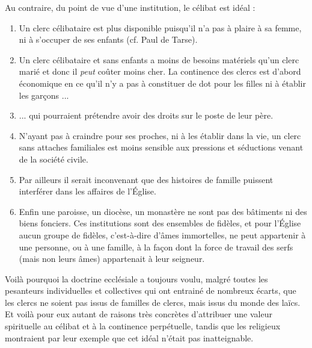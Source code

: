  Au contraire, du point de vue d'une institution, le célibat est idéal :
\begin{enumerate}
\item Un clerc célibataire est plus disponible puisqu'il n'a pas à plaire à sa femme, ni à s'occuper de ses enfants (cf. Paul de Tarse).
\item Un clerc célibataire et sans enfants a moins de besoins matériels qu'un clerc marié et donc il \emph{peut} coûter moins cher. La continence des clercs est d'abord économique en ce qu'il n'y a pas à constituer de dot pour les filles ni à établir les garçons ...
\item ... qui pourraient prétendre avoir des droits sur le poste de leur père.
\item N'ayant pas à craindre pour ses proches, ni à les établir dans la vie, un clerc sans attaches familiales est moins sensible aux pressions et séductions venant de la société civile.
\item Par ailleurs il serait inconvenant que des histoires de famille puissent interférer dans les affaires de l'Église.
\item Enfin une paroisse, un diocèse, un monastère ne sont pas des bâtiments ni des biens fonciers. Ces institutions sont des ensembles de fidèles, et pour l'Église aucun groupe de fidèles, c'est-à-dire d'âmes immortelles, ne peut appartenir à une personne, ou à une famille, à la façon dont la force de travail des serfs (mais non leurs âmes) appartenait à leur seigneur.
\end{enumerate} 

 Voilà pourquoi la doctrine ecclésiale a toujours voulu, malgré toutes les pesanteurs individuelles et collectives qui ont entrainé de nombreux écarts, que les clercs ne soient pas issus de familles de clercs, mais issus du monde des laïcs. Et voilà pour eux autant de raisons très concrètes d'attribuer une valeur spirituelle au célibat et à la continence perpétuelle, tandis que les religieux montraient par leur exemple que cet idéal n'était pas inatteignable. 

